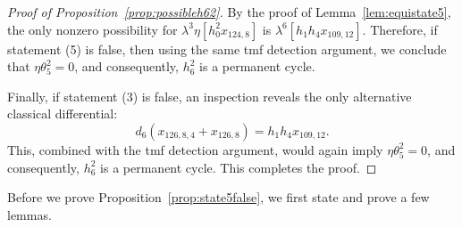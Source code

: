 \documentclass{amsart}
\numberwithin{equation}{section}
\begin{document}
\begin{proof}[Proof of Proposition~\ref{prop:possibleh62}]
By the proof of Lemma~\ref{lem:equistate5}, the only nonzero possibility for $\lambda^3 \eta [h_0^2x_{124,8}]$ is $\lambda^6 [h_1h_4x_{109,12}]$. Therefore, if statement (5) is false, then using the same tmf detection argument, we conclude that $\eta \theta_5^2 = 0$, and consequently, $h_6^2$ is a permanent cycle.

Finally, if statement (3) is false, an inspection reveals the only alternative classical differential:
$$d_6(x_{126,8,4} + x_{126,8}) = h_1h_4x_{109,12}.$$
This, combined with the tmf detection argument, would again imply $\eta \theta_5^2 = 0$, and consequently, $h_6^2$ is a permanent cycle. This completes the proof.
\end{proof}





Before we prove Proposition~\ref{prop:state5false}, we first state and prove a few lemmas.
\end{document}
